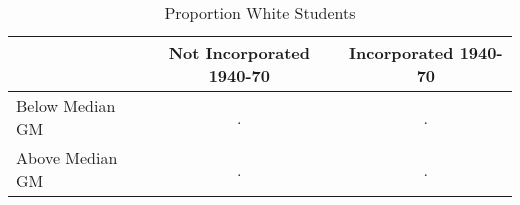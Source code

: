 \begin{table}[htbp]\centering
\caption{Proportion White Students}
\begin{tabular}{l*{2}{c}}
\hline\hline
                    &Not Incorporated 1940-70&Incorporated 1940-70\\
\hline
Below Median GM     &           .&           .\\
Above Median GM     &           .&           .\\
\hline\hline
\end{tabular}
\end{table}

